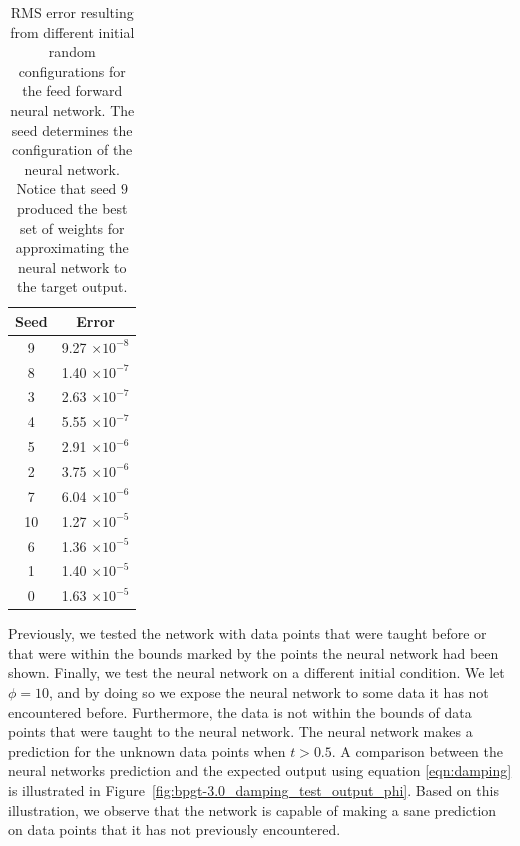 \documentclass[11pt]{article}
\begin{document}
\begin{table}
	\begin{center}
		\begin{tabular}{|c|c|}
		\hline
		Seed & Error\\
		\hline
		9 & 9.27 $\times 10^{-8}$\\
		8 & 1.40 $\times 10^{-7}$\\
		3 & 2.63 $\times 10^{-7}$\\
		4 & 5.55 $\times 10^{-7}$\\
		5 & 2.91 $\times 10^{-6}$\\
		2 & 3.75 $\times 10^{-6}$\\
		7 & 6.04 $\times 10^{-6}$\\
		10 & 1.27 $\times 10^{-5}$\\
		6 & 1.36 $\times 10^{-5}$\\
		1 & 1.40 $\times 10^{-5}$\\
		0 & 1.63 $\times 10^{-5}$\\
		\hline
		\end{tabular}
	\end{center}
	\caption{RMS error resulting from different initial random configurations for the feed forward neural network. The seed determines the configuration of the neural network. Notice that seed $9$ produced the best set of weights for approximating the neural network to the target output.}
	\label{tab:training_seeds}
\end{table}

Previously, we tested the network with data points that were taught before or that were within the bounds marked by the points the
neural network had been shown. Finally, we test the neural network on a different initial condition. We let $\phi=10$, and by doing so
we expose the neural network to some data it has not encountered before. Furthermore, the data is not within the bounds of data points
that were taught to the neural network. The neural network makes a prediction for the unknown data points when $t > 0.5$. A comparison
between the neural networks prediction and the expected output using equation \ref{eqn:damping} is illustrated in
Figure~\ref{fig:bpgt-3.0_damping_test_output_phi}. Based on this illustration, we observe that the network is capable of making a sane
prediction on data points that it has not previously encountered.
\end{document}
